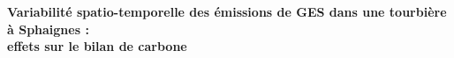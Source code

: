 {%
\vfill

\begin{framed}
	\begin{minipage}{\dimexpr\textwidth-2\fboxrule-2\fboxsep}
	\centering
		\vspace{0.2cm}
			{\Large\textbf{Variabilité spatio-temporelle des émissions de GES dans une tourbière à Sphaignes : \\effets sur le bilan de carbone}\\ \vspace{0.3cm}
			}
		\vspace{0.2cm}
	\end{minipage}
\end{framed}

} %

\vfill

